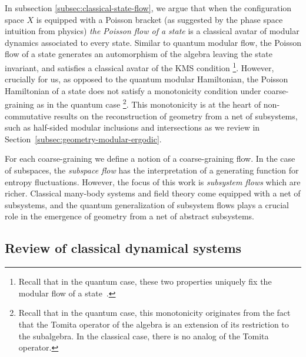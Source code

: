 \documentclass[a4paper,11pt]{article}
\theoremstyle{definition}
\begin{document}
In subsection \ref{subsec:classical-state-flow}, we argue that when the configuration space $X$ is equipped with a Poisson bracket (as suggested by the phase space intuition from physics) {\it the Poisson flow of a state} is a classical avatar of modular dynamics associated to every state. Similar to quantum modular flow, the Poisson flow of a state generates an automorphism of the algebra leaving the state invariant, and satisfies a classical avatar of the KMS condition \footnote{Recall that in the quantum case, these two properties uniquely fix the modular flow of a state~\cite{Takesaki1970}.}. However, crucially for us, as opposed to the quantum modular Hamiltonian, the Poisson Hamiltonian of a state does not satisfy a monotonicity condition under coarse-graining as in the quantum case \footnote{Recall that in the quantum case, this monotonicity originates from the fact that the Tomita operator of the algebra is an extension of its restriction to the subalgebra. In the classical case, there is no analog of the Tomita operator.}. This monotonicity is at the heart of non-commutative results on the reconstruction of geometry from a net of subsystems, such as half-sided modular inclusions and intersections as we review in Section~\ref{subsec:geometry-modular-ergodic}. 

For each coarse-graining we define a notion of a coarse-graining flow. In the case of subspaces, the {\it subspace flow} has the interpretation of a generating function for entropy fluctuations. However, the focus of this work is {\it subsystem flows} which are richer.
Classical many-body systems and field theory come equipped with a net of subsystems, and the quantum generalization of subsystem flows plays a crucial role in the emergence of geometry from a net of abstract subsystems. 

\subsection{Review of classical dynamical systems}\label{subsec:classical-definitions}
\end{document}
